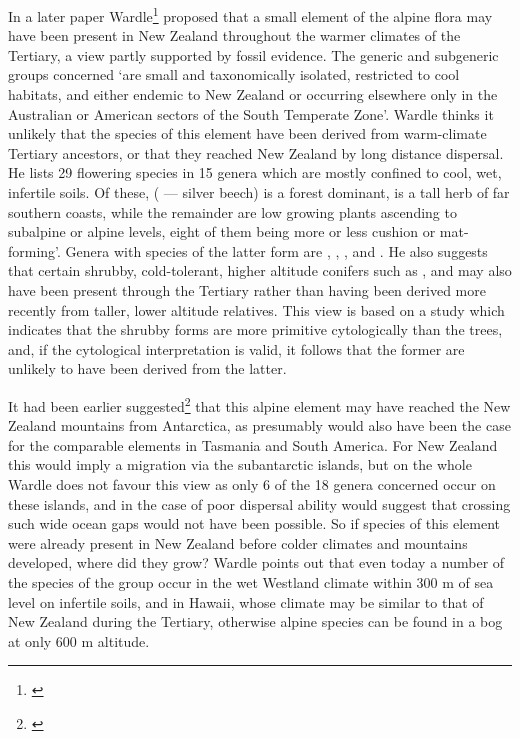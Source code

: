 In a later paper Wardle\footnote{\cite{wardle1968evidence}} proposed that a small element of the alpine flora may have been present in New Zealand throughout the warmer climates of the Tertiary, a view partly supported by fossil evidence.
The generic and subgeneric groups concerned `are small and taxonomically isolated, restricted to cool habitats, and either endemic to New Zealand or occurring elsewhere only in the Australian or American sectors of the South Temperate Zone'.
Wardle thinks it unlikely that the species of this element have been derived from warm-climate Tertiary ancestors, or that they reached New Zealand by long distance dispersal.
He lists 29 flowering species in 15 genera which are mostly confined to cool, wet, infertile soils.
Of these,  ( --- silver beech) is a forest dominant,  is a tall herb of far southern coasts, while the remainder are low growing plants ascending to subalpine or alpine levels, eight of them being more or less cushion or mat-forming'.
Genera with species of the latter form are , , ,  and .
He also suggests that certain shrubby, cold-tolerant, higher altitude conifers such as ,  and  may also have been present through the Tertiary rather than having been derived more recently from taller, lower altitude relatives.
This view is based on a study which indicates that the shrubby forms are more primitive cytologically than the trees, and, if the cytological interpretation is valid, it follows that the former are unlikely to have been derived from the latter.

It had been earlier suggested\footnote{\cite{fleming1963age}} that this alpine element may have reached the New Zealand mountains from Antarctica, as presumably would also have been the case for the comparable elements in Tasmania and South America.
For New Zealand this would imply a migration via the subantarctic islands, but on the whole Wardle does not favour this view as only 6 of the 18 genera concerned occur on these islands, and in the case of  poor dispersal ability would suggest that crossing such wide ocean gaps would not have been possible.
So if species of this element were already present in New Zealand before colder climates and mountains developed, where did they grow? Wardle points out that even today a number of the species of the group occur in the wet Westland climate within 300 m of sea level on infertile soils, and in Hawai{\okina}i, whose climate may be similar to that of New Zealand during the Tertiary, otherwise alpine species can be found in a bog at only 600 m altitude.

